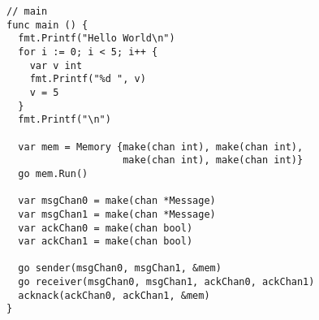 \begin{verbatim}
// main
func main () {
  fmt.Printf("Hello World\n")
  for i := 0; i < 5; i++ {
    var v int
    fmt.Printf("%d ", v)
    v = 5
  }
  fmt.Printf("\n")

  var mem = Memory {make(chan int), make(chan int),
                    make(chan int), make(chan int)}
  go mem.Run()

  var msgChan0 = make(chan *Message)
  var msgChan1 = make(chan *Message)
  var ackChan0 = make(chan bool)
  var ackChan1 = make(chan bool)

  go sender(msgChan0, msgChan1, &mem)
  go receiver(msgChan0, msgChan1, ackChan0, ackChan1)
  acknack(ackChan0, ackChan1, &mem)
}
\end{verbatim}
